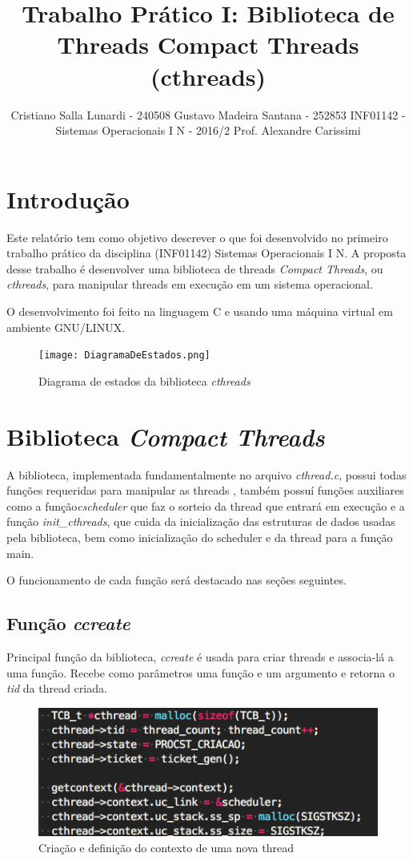 \documentclass{article}
\title{Trabalho Prático I: Biblioteca de Threads Compact Threads (cthreads)}
\author{Cristiano Salla Lunardi - 240508 \cr
Gustavo Madeira Santana - 252853 \cr\cr
INF01142 - Sistemas Operacionais I N - 2016/2\cr\cr
Prof. Alexandre Carissimi}
\date{}
\begin{document}
\maketitle

\section{Introdução}
Este relatório tem como objetivo descrever o que foi desenvolvido no primeiro trabalho prático da disciplina (INF01142) Sistemas Operacionais I N. A proposta desse trabalho é desenvolver uma biblioteca de threads \textit{Compact Threads}, ou \textit{cthreads}, para manipular threads em execução em um sistema operacional.

O desenvolvimento foi feito na linguagem C e usando uma máquina virtual em ambiente GNU/LINUX.

\begin{figure}[b]
    \centering
    \texttt{[image: DiagramaDeEstados.png]}
    \caption{Diagrama de estados da biblioteca \textit{cthreads}}
    \label{fig:sym4}
\end{figure}

\section{Biblioteca \textit{Compact Threads}}
A biblioteca, implementada fundamentalmente no arquivo \textit{cthread.c}, possui todas funções requeridas para manipular as threads \footnotemark, também possuí funções auxiliares como a função\textit{cscheduler} que faz o sorteio da thread que entrará em execução e a função \textit{init\_cthreads}, que cuida da inicialização das estruturas de dados usadas pela biblioteca, bem como inicialização do scheduler e da thread para a função main.

O funcionamento de cada função será destacado nas seções seguintes.

\subsection{Função \textit{ccreate}}
Principal função da biblioteca, \textit{ccreate} é usada para criar threads e associa-lá a uma função. Recebe como parâmetros uma função e um argumento e retorna o \textit{tid} da thread criada.

\begin{figure}[h]
    \centering
    \includegraphics[scale=0.4]{ccreate.png}
    \caption{Criação e definição do contexto de uma nova thread}
    \label{fig:sym4}
\end{figure}
\end{document}

